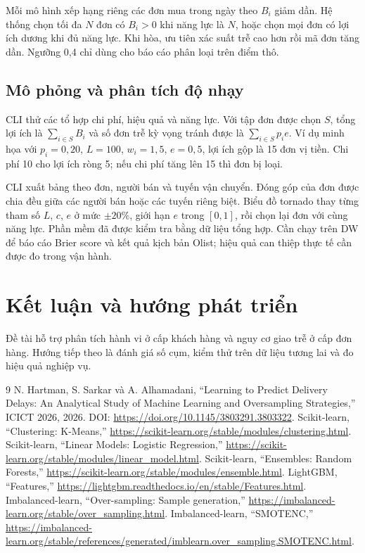 \documentclass[a4paper]{article}
\begin{document}
Mỗi mô hình xếp hạng riêng các đơn mua trong ngày theo $B_i$ giảm dần. Hệ thống chọn tối đa $N$ đơn có $B_i>0$ khi năng lực là $N$, hoặc chọn mọi đơn có lợi ích dương khi đủ năng lực. Khi hòa, ưu tiên xác suất trễ cao hơn rồi mã đơn tăng dần. Ngưỡng 0,4 chỉ dùng cho báo cáo phân loại trên điểm thô.

\subsection{Mô phỏng và phân tích độ nhạy}
CLI thử các tổ hợp chi phí, hiệu quả và năng lực. Với tập đơn được chọn $S$, tổng lợi ích là $\sum_{i\in S}B_i$ và số đơn trễ kỳ vọng tránh được là $\sum_{i\in S}p_i e$. Ví dụ minh họa với $p_i=0{,}20$, $L=100$, $w_i=1{,}5$, $e=0{,}5$, lợi ích gộp là 15 đơn vị tiền. Chi phí 10 cho lợi ích ròng 5; nếu chi phí tăng lên 15 thì đơn bị loại.

CLI xuất bảng theo đơn, người bán và tuyến vận chuyển. Đóng góp của đơn được chia đều giữa các người bán hoặc các tuyến riêng biệt. Biểu đồ tornado thay từng tham số $L$, $c$, $e$ ở mức $\pm20\%$, giới hạn $e$ trong $[0,1]$, rồi chọn lại đơn với cùng năng lực. Phần mềm đã được kiểm tra bằng dữ liệu tổng hợp. Cần chạy trên DW để báo cáo Brier score và kết quả kịch bản Olist; hiệu quả can thiệp thực tế cần được đo trong vận hành.

\section{Kết luận và hướng phát triển}
Đề tài hỗ trợ phân tích hành vi ở cấp khách hàng và nguy cơ giao trễ ở cấp đơn hàng. Hướng tiếp theo là đánh giá số cụm, kiểm thử trên dữ liệu tương lai và đo hiệu quả nghiệp vụ.

\begin{thebibliography}{9}
 N. Hartman, S. Sarkar và A. Alhamadani, ``Learning to Predict Delivery Delays: An Analytical Study of Machine Learning and Oversampling Strategies,'' ICICT 2026, 2026. DOI: \url{https://doi.org/10.1145/3803291.3803322}.
 Scikit-learn, ``Clustering: K-Means,'' \url{https://scikit-learn.org/stable/modules/clustering.html}.
 Scikit-learn, ``Linear Models: Logistic Regression,'' \url{https://scikit-learn.org/stable/modules/linear_model.html}.
 Scikit-learn, ``Ensembles: Random Forests,'' \url{https://scikit-learn.org/stable/modules/ensemble.html}.
 LightGBM, ``Features,'' \url{https://lightgbm.readthedocs.io/en/stable/Features.html}.
 Imbalanced-learn, ``Over-sampling: Sample generation,'' \url{https://imbalanced-learn.org/stable/over_sampling.html}.
 Imbalanced-learn, ``SMOTENC,'' \url{https://imbalanced-learn.org/stable/references/generated/imblearn.over_sampling.SMOTENC.html}.
\end{thebibliography}
\end{document}
